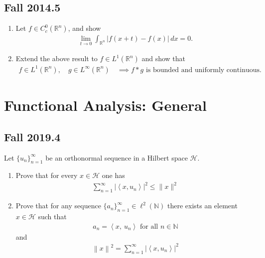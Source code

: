 \hypertarget{fall-2014.5}{%
\subsection{Fall 2014.5}\label{fall-2014.5}}

\begin{enumerate}
\def\labelenumi{\arabic{enumi}.}
\item
  Let \(f \in C_c^0({\mathbb{R}}^n)\), and show
  \begin{align*}
  \lim _{t \to 0} \int_{{\mathbb{R}}^n} |f(x+t) - f(x)| \, dx = 0
  .\end{align*}
\item
  Extend the above result to \(f\in L^1({\mathbb{R}}^n)\) and show that
  \begin{align*}
  f\in L^1({\mathbb{R}}^n), \quad g\in L^\infty({\mathbb{R}}^n) \quad
  \implies f \ast g \text{ is bounded and uniformly continuous. }
  \end{align*}
\end{enumerate}

\hypertarget{functional-analysis-general}{%
\section{Functional Analysis:
General}\label{functional-analysis-general}}

\hypertarget{fall-2019.4}{%
\subsection{Fall 2019.4}\label{fall-2019.4}}

Let \(\{u_n\}_{n=1}^∞\) be an orthonormal sequence in a Hilbert space
\(\mathcal{H}\).

\begin{enumerate}
\def\labelenumi{\alph{enumi}.}
\item
  Prove that for every \(x ∈ \mathcal H\) one has
  \begin{align*}
  \displaystyle\sum_{n=1}^{\infty}\left|\left\langle x, u_{n}\right\rangle\right|^{2} \leq\|x\|^{2}
  \end{align*}
\item
  Prove that for any sequence
  \(\{a_n\}_{n=1}^\infty \in \ell^2({\mathbb{N}})\) there exists an
  element \(x\in\mathcal H\) such that
  \begin{align*}
  a_n = {\left\langle {x},~{u_n} \right\rangle} \text{ for all } n\in {\mathbb{N}}
  \end{align*}
  and
  \begin{align*}
  {\left\lVert {x} \right\rVert}^2 = \sum_{n=1}^{\infty}\left|\left\langle x, u_{n}\right\rangle\right|^{2}
  \end{align*}
\end{enumerate}

